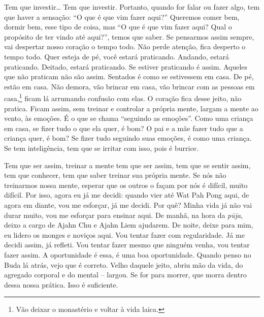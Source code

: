 Tem que investir… Tem que investir. Portanto, quando for falar ou
fazer algo, tem que haver a sensação: “O que é que vim fazer aqui?”
Queremos comer bem, dormir bem, esse tipo de coisa, mas “O que é que
vim fazer aqui? Qual o propósito de ter vindo até aqui?”, temos que
saber. Se pensarmos assim sempre, vai despertar nosso coração o tempo
todo. Não perde atenção, fica desperto o tempo todo. Quer esteja de pé,
você estará praticando. Andando, estará praticando. Deitado, estará
praticando. Se estiver praticando é assim. Aqueles que não praticam não
são assim. Sentados é como se estivessem em casa. De pé, estão em casa.
Não demora, vão brincar em casa, vão brincar com as pessoas em
casa,\footnote{Vão deixar o monastério e voltar à vida laica.} ficam lá
arrumando confusão com elas. O coração fica desse jeito, não pratica.
Ficam assim, sem treinar e controlar a própria mente, largam a mente ao
vento, às emoções. É o que se chama “seguindo as emoções”. Como uma
criança em casa, se fizer tudo o que ela quer, é bom? O pai e a mãe
fazer tudo que a criança quer, é bom? Se fizer tudo seguindo suas
emoções, é como uma criança. Se tem inteligência, tem que se irritar
com isso, pois é burrice. 

Tem que ser assim, treinar a mente tem que ser assim, tem que se
sentir assim, tem que conhecer, tem que saber treinar sua própria
mente. Se nós não treinarmos nossa mente, esperar que os outros o façam
por nós é difícil, muito difícil. Por isso, agora eu já me decidi:
quando vier até Wat Pah Pong aqui, de agora em diante, vou me esforçar,
já me decidi. Por quê? Minha vida já não vai durar muito, vou me
esforçar para ensinar aqui. De manhã, na hora da \textit{pūja}, deixo
a cargo de Ajahn Chu e Ajahn Liem ajudarem. De noite, deixe para mim,
eu lidero os monges e noviços aqui. Vou tentar fazer com regularidade.
Já me decidi assim, já refleti. Vou tentar fazer mesmo que ninguém
venha, vou tentar fazer assim. A oportunidade é essa, é uma boa
oportunidade. Quando penso no Buda lá atrás, vejo que é correto. Velho
daquele jeito, abriu mão da vida, do agregado corporal e do mental –
largou. Se for para morrer, que morra dentro dessa nossa prática. Isso
é suficiente.

